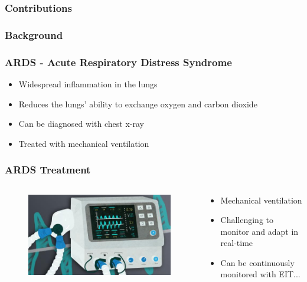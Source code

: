 \documentclass[10pt,    %
    english,            %
    xcolor=table,       %
    envcountsect,        %
    aspectratio=1610
]{beamer}
\begin{document}
\begin{frame}
	\frametitle{Contributions}
\end{frame}

\begin{frame}
	\frametitle{Background}

\end{frame}


\begin{frame}
\frametitle{ARDS - Acute Respiratory Distress Syndrome}    
\begin{itemize}
	\item Widespread inflammation in the lungs 
	\item Reduces the lungs’ ability to exchange oxygen and carbon dioxide
	\item Can be diagnosed with chest x-ray 
	\item Treated with mechanical ventilation
\end{itemize}
\end{frame}

\begin{frame}
	\frametitle{ARDS Treatment}    
	\begin{columns}[c]
		\begin{column}{0.5\textwidth}
			\begin{figure}
				\includegraphics[width=\textwidth]{VentilatorCourseImageII.jpg}
			\end{figure}
		\end{column}
		\begin{column}{0.5\textwidth}
			\begin{itemize}
					\item Mechanical ventilation 
					\item Challenging to monitor and adapt in real-time
					\item Can be continuously monitored with EIT...
			\end{itemize}
		\end{column}
	\end{columns}
\end{frame}
\end{document}

